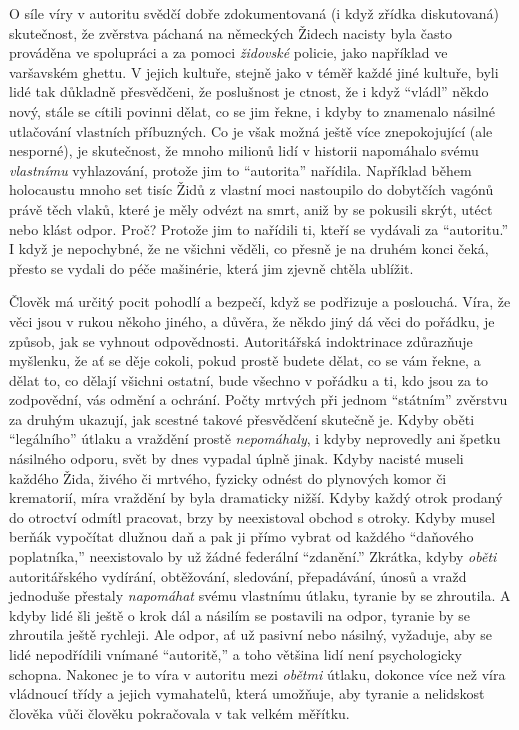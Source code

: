 \documentclass{book}
\begin{document}
O síle víry v autoritu svědčí dobře zdokumentovaná (i když zřídka diskutovaná) skutečnost, že zvěrstva páchaná na německých Židech nacisty byla často prováděna ve spolupráci a za pomoci \emph{židovské} policie, jako například ve varšavském ghettu. V jejich kultuře, stejně jako v téměř každé jiné kultuře, byli lidé tak důkladně přesvědčeni, že poslušnost je ctnost, že i když \enquote{vládl} někdo nový, stále se cítili povinni dělat, co se jim řekne, i kdyby to znamenalo násilné utlačování vlastních příbuzných. Co je však možná ještě více znepokojující (ale nesporné), je skutečnost, že mnoho milionů lidí v historii napomáhalo svému \emph{vlastnímu} vyhlazování, protože jim to \enquote{autorita} nařídila. Například během holocaustu mnoho set tisíc Židů z vlastní moci nastoupilo do dobytčích vagónů právě těch vlaků, které je měly odvézt na smrt, aniž by se pokusili skrýt, utéct nebo klást odpor. Proč? Protože jim to nařídili ti, kteří se vydávali za \enquote{autoritu.} I když je nepochybné, že ne všichni věděli, co přesně je na druhém konci čeká, přesto se vydali do péče mašinérie, která jim zjevně chtěla ublížit.

Člověk má určitý pocit pohodlí a bezpečí, když se podřizuje a poslouchá. Víra, že věci jsou v rukou někoho jiného, a důvěra, že někdo jiný dá věci do pořádku, je způsob, jak se vyhnout odpovědnosti. Autoritářská indoktrinace zdůrazňuje myšlenku, že ať se děje cokoli, pokud prostě budete dělat, co se vám řekne, a dělat to, co dělají všichni ostatní, bude všechno v pořádku a ti, kdo jsou za to zodpovědní, vás odmění a ochrání. Počty mrtvých při jednom \enquote{státním} zvěrstvu za druhým ukazují, jak scestné takové přesvědčení skutečně je. Kdyby oběti \enquote{legálního} útlaku a vraždění prostě \emph{nepomáhaly}, i kdyby neprovedly ani špetku násilného odporu, svět by dnes vypadal úplně jinak. Kdyby nacisté museli každého Žida, živého či mrtvého, fyzicky odnést do plynových komor či krematorií, míra vraždění by byla dramaticky nižší. Kdyby každý otrok prodaný do otroctví odmítl pracovat, brzy by neexistoval obchod s otroky. Kdyby musel berňák vypočítat dlužnou daň a pak ji přímo vybrat od každého \enquote{daňového poplatníka,} neexistovalo by už žádné federální \enquote{zdanění.} Zkrátka, kdyby \emph{oběti} autoritářského vydírání, obtěžování, sledování, přepadávání, únosů a vražd jednoduše přestaly \emph{napomáhat} svému vlastnímu útlaku, tyranie by se zhroutila. A kdyby lidé šli ještě o krok dál a násilím se postavili na odpor, tyranie by se zhroutila ještě rychleji. Ale odpor, ať už pasivní nebo násilný, vyžaduje, aby se lidé nepodřídili vnímané \enquote{autoritě,} a toho většina lidí není psychologicky schopna. Nakonec je to víra v autoritu mezi \emph{obětmi} útlaku, dokonce více než víra vládnoucí třídy a jejich vymahatelů, která umožňuje, aby tyranie a nelidskost člověka vůči člověku pokračovala v tak velkém měřítku.
\end{document}
